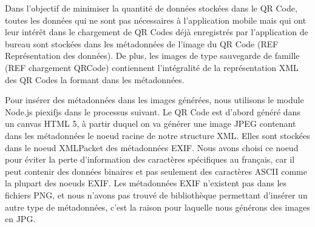 \par
Dans l'objectif de minimiser la quantité de données stockées dans le QR Code, toutes les données qui ne sont pas nécessaires à l'application mobile mais qui ont leur intérêt dans le chargement de QR Codes déjà enregistrés par l'application de bureau sont stockées dans les métadonnées de l'image du QR Code (REF Représentation des données). De plus, les images de type sauvegarde de famille (REF chargement QRCode) contiennent l'intégralité de la représentation XML des QR Codes la formant dans les métadonnées.\\
\par
Pour insérer des métadonnées dans les images générées, nous utilisons le module Node.js piexifjs dans le processus suivant. Le QR Code est d'abord généré dans un canvas HTML 5, à partir duquel on va générer une image JPEG contenant dans les métadonnées le noeud racine de notre structure XML. Elles sont stockées dans le noeud XMLPacket des métadonnées EXIF. Nous avons choisi ce noeud pour éviter la perte d'information des caractères spécifiques au français, car il peut contenir des données binaires et pas seulement des caractères ASCII comme la plupart des noeuds EXIF. Les métadonnées EXIF n'existent pas dans les fichiers PNG, et nous n'avons pas trouvé de bibliothèque permettant d'insérer un autre type de métadonnées, c'est la raison pour laquelle nous générons des images en JPG.